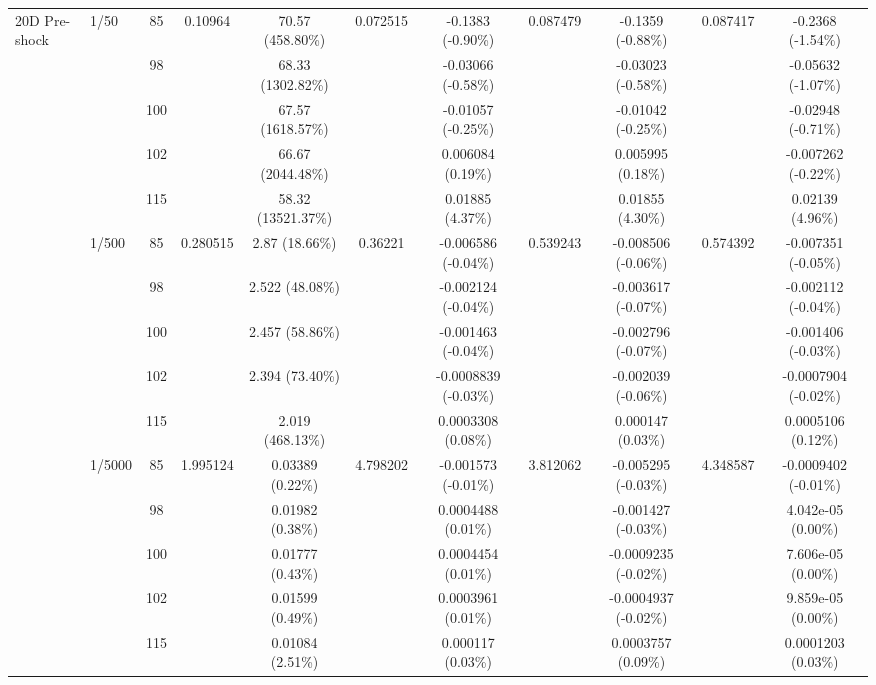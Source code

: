 \begin{table}[htbp]
{\begin{tabular}{llccccccccc}
\multirow{15}{*}{20D Pre-shock}
& \multirow{5}{*}{1/50} & 85 & \multirow{5}{*}{0.10964} & 70.57 (458.80\%) & \multirow{5}{*}{0.072515} & -0.1383 (-0.90\%) & \multirow{5}{*}{0.087479} & -0.1359 (-0.88\%) & \multirow{5}{*}{0.087417} & -0.2368 (-1.54\%) \\
& & 98 & & 68.33 (1302.82\%) & & -0.03066 (-0.58\%) & & -0.03023 (-0.58\%) & & -0.05632 (-1.07\%) \\
& & 100 & & 67.57 (1618.57\%) & & -0.01057 (-0.25\%) & & -0.01042 (-0.25\%) & & -0.02948 (-0.71\%) \\
& & 102 & & 66.67 (2044.48\%) & & 0.006084 (0.19\%) & & 0.005995 (0.18\%) & & -0.007262 (-0.22\%) \\
& & 115 & & 58.32 (13521.37\%) & & 0.01885 (4.37\%) & & 0.01855 (4.30\%) & & 0.02139 (4.96\%) \\
\cmidrule(lr){2-11}
& \multirow{5}{*}{1/500} & 85 & \multirow{5}{*}{0.280515} & 2.87 (18.66\%) & \multirow{5}{*}{0.36221} & -0.006586 (-0.04\%) & \multirow{5}{*}{0.539243} & -0.008506 (-0.06\%) & \multirow{5}{*}{0.574392} & -0.007351 (-0.05\%) \\
& & 98 & & 2.522 (48.08\%) & & -0.002124 (-0.04\%) & & -0.003617 (-0.07\%) & & -0.002112 (-0.04\%) \\
& & 100 & & 2.457 (58.86\%) & & -0.001463 (-0.04\%) & & -0.002796 (-0.07\%) & & -0.001406 (-0.03\%) \\
& & 102 & & 2.394 (73.40\%) & & -0.0008839 (-0.03\%) & & -0.002039 (-0.06\%) & & -0.0007904 (-0.02\%) \\
& & 115 & & 2.019 (468.13\%) & & 0.0003308 (0.08\%) & & 0.000147 (0.03\%) & & 0.0005106 (0.12\%) \\
\cmidrule(lr){2-11}
& \multirow{5}{*}{1/5000} & 85 & \multirow{5}{*}{1.995124} & 0.03389 (0.22\%) & \multirow{5}{*}{4.798202} & -0.001573 (-0.01\%) & \multirow{5}{*}{3.812062} & -0.005295 (-0.03\%) & \multirow{5}{*}{4.348587} & -0.0009402 (-0.01\%) \\
& & 98 & & 0.01982 (0.38\%) & & 0.0004488 (0.01\%) & & -0.001427 (-0.03\%) & & 4.042e-05 (0.00\%) \\
& & 100 & & 0.01777 (0.43\%) & & 0.0004454 (0.01\%) & & -0.0009235 (-0.02\%) & & 7.606e-05 (0.00\%) \\
& & 102 & & 0.01599 (0.49\%) & & 0.0003961 (0.01\%) & & -0.0004937 (-0.02\%) & & 9.859e-05 (0.00\%) \\
& & 115 & & 0.01084 (2.51\%) & & 0.000117 (0.03\%) & & 0.0003757 (0.09\%) & & 0.0001203 (0.03\%) \\
\midrule


\end{tabular}}
\end{table}
